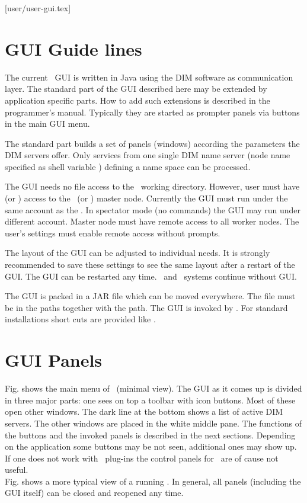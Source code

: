 [user/user-gui.tex]
\section{GUI Guide lines}
The current \dabc\ GUI is written in Java using the DIM software as communication layer.
The standard part of the GUI described here may be extended by application specific parts.
How to add such extensions is described in the programmer's manual.
Typically they are started as prompter panels via buttons in the
main GUI menu.

The standard part builds a set of panels (windows) according the parameters
the DIM servers offer. Only services from one single DIM name server
(node name specified as shell variable )
defining a name space can be processed.

The GUI needs no file access to the \dabc\ working directory.
However, user must have  (or ) access to
the \dabc\ (or \mbs) master node.
Currently the GUI must run under the same account as the \dabc.
In spectator mode (no commands) the GUI may run under different account.
Master node must have remote access to all worker nodes.
The user's  settings must enable remote access without
prompts.

The layout of the GUI can be adjusted to individual needs.
It is strongly recommended to save these settings to see the same layout
after a restart of the GUI. The GUI can be restarted any time.
\dabc\ and \mbs\ systems continue without GUI.

The GUI is packed in a JAR file  which can be moved everywhere. The file must be in the
 paths together with the  path.
The GUI is invoked by .
For standard installations short cuts are provided like .

\section{GUI Panels}
Fig.  shows the main menu of \dabc\ (minimal view).
The GUI as it comes up is divided in three major parts: 
one sees on top a toolbar with icon buttons. Most of these open
other windows. The dark line at the bottom shows a list of active DIM servers.
The other windows are placed in the white middle pane. The functions of the buttons and the
invoked panels is described in the next sections.
Depending on the application some buttons may be not seen, additional ones may show up.
If one does not work with \mbs\ plug-ins the control panels for \mbs\
are of cause not useful.\\
Fig. \paref{fig:user-gui-full-screen} shows a more typical view of a running \dabc.
In general, all panels (including the GUI itself) can be closed and reopened any time.


